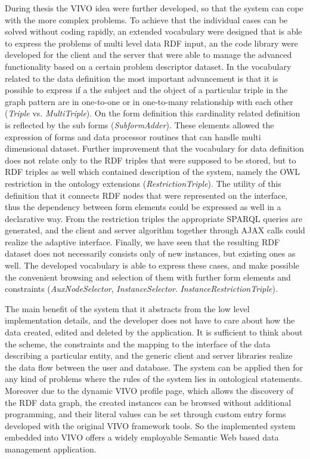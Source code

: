 During thesis the VIVO idea were further developed, so that the system can cope with the more complex problems. To achieve that the individual cases can be solved without coding rapidly, an extended vocabulary were designed that is able to express the problems of multi level data RDF input, an the code library were developed for the client and the server that were able to manage the advanced functionality based on a certain problem descriptor dataset. In the vocabulary related to the data definition the most important advancement is that it is possible to express if a the subject and the object of a particular triple in the graph pattern are in one-to-one or in one-to-many relationship with each other (\textit{Triple} vs. \textit{MultiTriple}). On the form definition this cardinality related definition is reflected by the sub forms (\textit{SubformAdder}). These elements allowed the expression of forms and data processor routines that can handle multi dimensional dataset. Further improvement that the vocabulary for data definition does not relate only to the RDF triples that were supposed to be stored, but to RDF triples as well which contained description of the system, namely the OWL restriction in the ontology extensions (\textit{RestrictionTriple}). The utility of this definition that it connects RDF nodes that were represented on the interface, thus the dependency between form elements could be expressed as well in a declarative way. From the restriction triples the appropriate SPARQL queries are generated, and the client and server algorithm together through AJAX calls could realize the adaptive interface. Finally, we have seen that the resulting RDF dataset does not necessarily consists only of new instances, but existing ones as well. The developed vocabulary is able to express these cases, and make possible the convenient browsing and selection of them with further form elements and constraints (\textit{AuxNodeSelector}, \textit{InstanceSelector}. \textit{InstanceRestrictionTriple}). 

The main benefit of the system that it abstracts from the low level implementation details, and the developer does not have to care about how the data created, edited and deleted by the application. It is sufficient to think about the scheme, the constraints and the mapping to the interface of the data describing a particular entity, and the generic client and server libraries realize the data flow between the user and database. The system can be applied then for any kind of problems where the rules of the system lies in ontological statements. Moreover due to the dynamic VIVO profile page, which allows the discovery of the RDF data graph, the created instances can be browsed without additional programming, and their literal values can be set through custom entry forms developed with the original VIVO framework tools. So the implemented system embedded into VIVO offers a widely employable Semantic Web based data management application.

